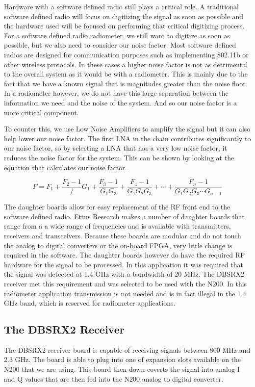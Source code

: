 Hardware with a software defined radio still plays a critical role.  A traditional software defined radio will focus on digitizing the signal as soon as possible and the hardware used will be focused on performing that critical digitizing process.  For a software defined radio radiometer, we still want to digitize as soon as possible, but we also need to consider our noise factor.  Most software defined radios are designed for communication purposes such as implementing 802.11b or other wireless protocols.  In these cases a higher noise factor is not as detrimental to the overall system as it would be with a radiometer.  This is mainly due to the fact that we have a known signal that is magnitudes greater than the noise floor.  In a radiometer however, we do not have this large separation between the information we need and the noise of the system.  And so our noise factor is a more critical component.  

To counter this, we use Low Noise Amplifiers to amplify the signal but it can also help lower our noise factor.  The first LNA in the chain contributes significantly to our noise factor, so by selecting a LNA that has a very low noise factor, it reduces the noise factor for the system.  This can be shown by looking at the equation that calculates our noise factor.

\begin{equation}
F=F_1+\frac{F_2-1}/{G_1}+\frac{F_3-1}{G_1 G_2}+\frac{F_4-1}{G_1 G_2 G_3}+\cdots +\frac{F_n-1}{G_1 G_2 G_3 \cdots G_{n-1}}
\end{equation}

The daughter boards allow for easy replacement of the RF front end to the software defined radio.  Ettus Research makes a number of daughter boards that range from a a wide range of frequencies and is available with transmitters, receivers and transceivers.  Because these boards are modular and do not touch the analog to digital converters or the on-board FPGA, very little change is required in the software.  The daughter boards however do have the required RF hardware for the signal to be processed.  In this application it was required that the signal was detected at 1.4 GHz with a bandwidth of 20 MHz.  The DBSRX2 receiver met this requirement and was selected to be used with the N200.  In this radiometer application transmission is not needed and is in fact illegal in the 1.4 GHz band, which is reserved for radiometer applications.

\subsection{The DBSRX2 Receiver}
The DBSRX2 receiver board is capable of receiving signals between 800 MHz and 2.3 GHz.  The board is able to plug into one of expansion slots available on the N200 that we are using.  This board then down-coverts the signal into analog I and Q values that are then fed into the N200 analog to digital converter.

